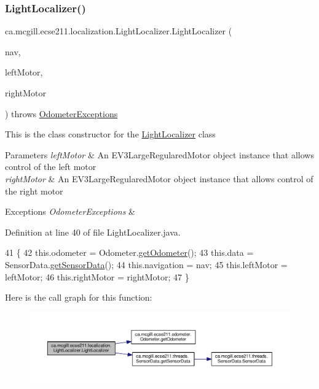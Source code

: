 \subsubsection{\texorpdfstring{Light\+Localizer()}{LightLocalizer()}}
{\footnotesize\ttfamily ca.\+mcgill.\+ecse211.\+localization.\+Light\+Localizer.\+Light\+Localizer (\begin{DoxyParamCaption}\item[{\hyperlink{classca_1_1mcgill_1_1ecse211_1_1project_1_1_navigation}{Navigation}}]{nav,  }\item[{E\+V3\+Large\+Regulated\+Motor}]{left\+Motor,  }\item[{E\+V3\+Large\+Regulated\+Motor}]{right\+Motor }\end{DoxyParamCaption}) throws \hyperlink{classca_1_1mcgill_1_1ecse211_1_1odometer_1_1_odometer_exceptions}{Odometer\+Exceptions}}

This is the class constructor for the \hyperlink{classca_1_1mcgill_1_1ecse211_1_1localization_1_1_light_localizer}{Light\+Localizer} class


\begin{DoxyParams}{Parameters}
{\em left\+Motor} & An E\+V3\+Large\+Regulared\+Motor object instance that allows control of the left motor \\
\hline
{\em right\+Motor} & An E\+V3\+Large\+Regulared\+Motor object instance that allows control of the right motor \\
\hline
\end{DoxyParams}

\begin{DoxyExceptions}{Exceptions}
{\em Odometer\+Exceptions} & \\
\hline
\end{DoxyExceptions}


Definition at line 40 of file Light\+Localizer.\+java.


\begin{DoxyCode}
41                                                                    \{
42     this.odometer = Odometer.\hyperlink{classca_1_1mcgill_1_1ecse211_1_1odometer_1_1_odometer_a99171f11e34dea918fa9dd069d721439}{getOdometer}();
43     this.data = SensorData.\hyperlink{classca_1_1mcgill_1_1ecse211_1_1threads_1_1_sensor_data_a8260aba53b4474ca1275e4ce26157977}{getSensorData}();
44     this.navigation = nav;
45     this.leftMotor = leftMotor;
46     this.rightMotor = rightMotor;
47   \}
\end{DoxyCode}
Here is the call graph for this function\+:\nopagebreak
\begin{figure}[H]
\begin{center}
\leavevmode
\includegraphics[width=350pt]{classca_1_1mcgill_1_1ecse211_1_1localization_1_1_light_localizer_aa37a75b7c32c02fe261845021f0734b7_cgraph}
\end{center}
\end{figure}



